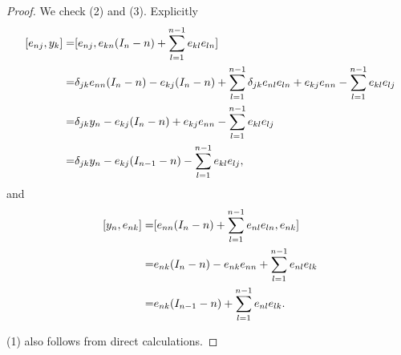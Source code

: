 \documentclass[12pt,a4paper]{amsart}
\numberwithin{equation}{section}
\begin{document}
\begin{proof}
%
%
 We check (2) and (3). Explicitly
$$\aligned \ [e_{nj},y_k]
=&[e_{nj},e_{kn}(I_{n}-n)
+\sum_{l=1}^{n-1} e_{kl}e_{ln}]\\
=& \delta_{jk}e_{nn}(I_n-n)-e_{kj}(I_n-n)
+\sum_{l=1}^{n-1} \delta_{jk}e_{nl}e_{ln}
+ e_{kj}e_{nn}
-\sum_{l=1}^{n-1} e_{kl}e_{lj}\\
=& \delta_{jk}y_n-e_{kj}(I_n-n)
+ e_{kj}e_{nn}
-\sum_{l=1}^{n-1} e_{kl}e_{lj}\\
=& \delta_{jk}y_n-e_{kj}(I_{n-1}-n)
-\sum_{l=1}^{n-1} e_{kl}e_{lj},
\endaligned$$
and
$$\aligned \  [y_n,e_{nk}]
=&[e_{nn}(I_{n}-n)
+\sum_{l=1}^{n-1} e_{nl}e_{ln},e_{nk}]\\
=& e_{nk}(I_{n}-n)
-e_{nk}e_{nn}
+\sum_{l=1}^{n-1} e_{nl}e_{lk}\\
=& e_{nk}(I_{n-1}-n)+\sum_{l=1}^{n-1} e_{nl}e_{lk}.
\endaligned$$

(1) also follows from direct calculations.
\end{proof}


\end{document}
